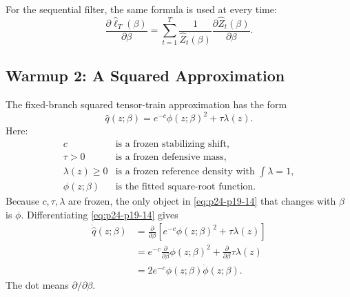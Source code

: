 \documentclass[11pt]{article}
\numberwithin{equation}{section}
\newcommand{\widehatell}{\widehat\ell}
\begin{document}
For the sequential filter, the same formula is used at every time:
\begin{equation}
    \frac{\partial\widehatell_T(\beta)}{\partial\beta}
    =
    \sum_{t=1}^{T}
    \frac{1}{\widehat Z_t(\beta)}
    \frac{\partial\widehat Z_t(\beta)}{\partial\beta}.
    \label{eq:p24-p19-13}
\end{equation}

\subsection{Warmup 2: A Squared Approximation}

The fixed-branch squared tensor-train approximation has the form
\begin{equation}
    \widehat q(z;\beta)
    =
    e^{-c}\phi(z;\beta)^2+\tau\lambda(z).
    \label{eq:p24-p19-14}
\end{equation}
Here:
\begin{equation}
\begin{array}{ll}
c & \text{is a frozen stabilizing shift},\\
\tau>0 & \text{is a frozen defensive mass},\\
\lambda(z)\ge0 & \text{is a frozen reference density with }\int\lambda=1,\\
\phi(z;\beta) & \text{is the fitted square-root function.}
\end{array}
\label{eq:p24-p19-15}
\end{equation}
Because \(c,\tau,\lambda\) are frozen, the only object in \eqref{eq:p24-p19-14} that changes
with \(\beta\) is \(\phi\).  Differentiating \eqref{eq:p24-p19-14} gives
\begin{equation}
\begin{aligned}
    \dot{\widehat q}(z;\beta)
    &=
    \frac{\partial}{\partial\beta}
    \left[
    e^{-c}\phi(z;\beta)^2+\tau\lambda(z)
    \right]\\
    &=
    e^{-c}
    \frac{\partial}{\partial\beta}\phi(z;\beta)^2
    +
    \frac{\partial}{\partial\beta}\tau\lambda(z)\\
    &=
    2e^{-c}\phi(z;\beta)\dot\phi(z;\beta).
\end{aligned}
\label{eq:p24-p19-16}
\end{equation}
The dot means \(\partial/\partial\beta\).
\end{document}
